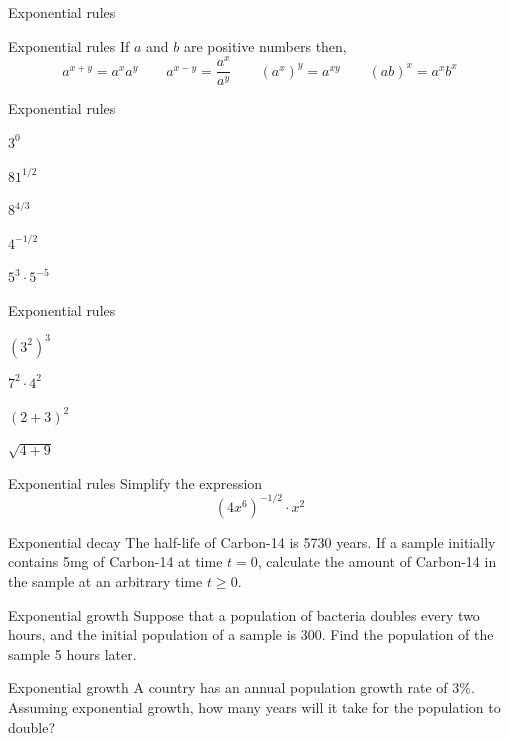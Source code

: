 \documentclass[t,handout]{beamer}
\newenvironment{fpi}
  {\itemize[nolistsep,itemsep=\fill]}
  {\vfill\enditemize}
\begin{document}
\begin{frame}{Exponential rules}
\begin{block}{Exponential rules}
If $a$ and $b$ are positive numbers then,
$$a^{x+y} = a^x a^y \qquad a^{x-y} = \frac{a^x}{a^y}  \qquad (a^x)^y = a^{xy} \qquad (ab)^x = a^x b^x$$
\end{block}
\end{frame}

\begin{frame}{Exponential rules}
\begin{fpi}
\item $3^0$
\item $81^{1/2}$
\item $8^{4/3}$
\item $4^{-1/2}$
\item $5^3 \cdot 5^{-5}$
\end{fpi}
\end{frame}

\begin{frame}{Exponential rules}
\begin{fpi}
\item $(3^2)^3$
\item $7^2 \cdot 4^2$
\item $(2 + 3)^2$
\item $\sqrt{4 + 9}$
\end{fpi}
\end{frame}

\begin{frame}{Exponential rules}
Simplify the expression
$$(4x^6)^{-1/2} \cdot x^2$$
\end{frame}

\begin{frame} {Exponential decay}
The half-life of Carbon-14 is 5730 years.  If a sample initially
contains 5mg of Carbon-14 at time $t=0$, calculate the amount
of Carbon-14 in the sample at an arbitrary time $t \ge 0$.
\end{frame}

\begin{frame} {Exponential growth}
Suppose that a population of bacteria doubles every two hours, and the initial
population of a sample is 300.  Find the population of the sample 5 hours later.
\end{frame}

\begin{frame} {Exponential growth}
A country has an annual population growth rate of 3\%. Assuming exponential growth, how many
years will it take for the population to double?
\end{frame}
\end{document}
